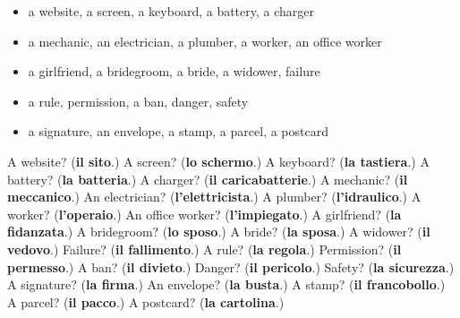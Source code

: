 \begin{itemize}
\raggedright
  \item a website, a screen, a keyboard, a battery, a charger
  \item a mechanic, an electrician, a plumber, a worker, an office worker
  \item a girlfriend, a bridegroom, a bride, a widower, failure
  \item a rule, permission, a ban, danger, safety
  \item a signature, an envelope, a stamp, a parcel, a postcard
\end{itemize}

\begin{tcolorbox}[breakable,colback=teal!4,colframe=teal!35!black,title={Before you move on}]
A website? (\textbf{il sito}.) A screen? (\textbf{lo schermo}.) A keyboard? (\textbf{la tastiera}.) A battery? (\textbf{la batteria}.) A charger? (\textbf{il caricabatterie}.) A mechanic? (\textbf{il meccanico}.) An electrician? (\textbf{l'elettricista}.) A plumber? (\textbf{l'idraulico}.) A worker? (\textbf{l'operaio}.) An office worker? (\textbf{l'impiegato}.) A girlfriend? (\textbf{la fidanzata}.) A bridegroom? (\textbf{lo sposo}.) A bride? (\textbf{la sposa}.) A widower? (\textbf{il vedovo}.) Failure? (\textbf{il fallimento}.) A rule? (\textbf{la regola}.) Permission? (\textbf{il permesso}.) A ban? (\textbf{il divieto}.) Danger? (\textbf{il pericolo}.) Safety? (\textbf{la sicurezza}.) A signature? (\textbf{la firma}.) An envelope? (\textbf{la busta}.) A stamp? (\textbf{il francobollo}.) A parcel? (\textbf{il pacco}.) A postcard? (\textbf{la cartolina}.)
\end{tcolorbox}
